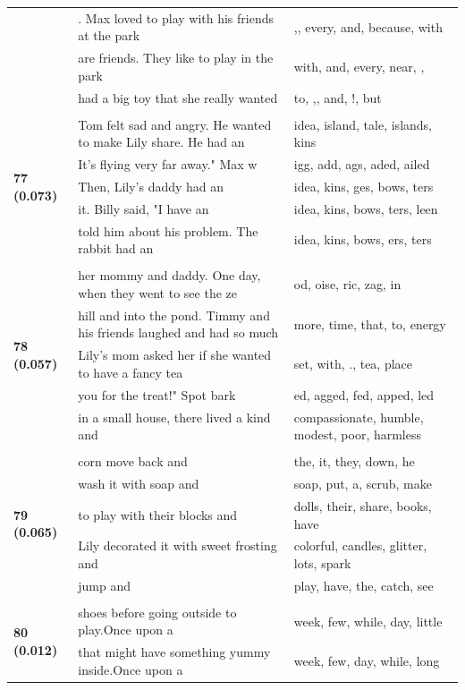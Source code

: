 \documentclass{article}
\theoremstyle{plain}
\theoremstyle{definition}
\theoremstyle{remark}
\begin{document}
\begin{longtable}{|p{}|p{}|p{}|}
& . Max loved to play with his friends at the park & ,,  every,  and,  because,  with \\
& are friends. They like to play in the park & with,  and,  every,  near, , \\
& had a big toy that she really wanted & to, ,,  and, !,  but \\
& & \\
\multirow{5}{*}{\textbf{77 (0.073)}} & Tom felt sad and angry. He wanted to make Lily share. He had an & idea,  island,  tale,  islands, kins \\
& It's flying very far away."  Max w & igg, add, ags, aded, ailed \\
& Then, Lily's daddy had an & idea, kins, ges, bows, ters \\
& it. Billy said, "I have an & idea, kins, bows, ters, leen \\
& told him about his problem.   The rabbit had an & idea, kins, bows, ers, ters \\
& & \\
\multirow{5}{*}{\textbf{78 (0.057)}} & her mommy and daddy. One day, when they went to see the ze & od, oise, ric, zag, in \\
& hill and into the pond. Timmy and his friends laughed and had so much & more,  time,  that,  to,  energy \\
& Lily's mom asked her if she wanted to have a fancy tea & set,  with, .,  tea,  place \\
& you for the treat!" Spot bark & ed, agged, fed, apped, led \\
& in a small house, there lived a kind and & compassionate,  humble,  modest,  poor,  harmless \\
& & \\
\multirow{5}{*}{\textbf{79 (0.065)}} & corn move back and & the,  it,  they,  down,  he \\
& wash it with soap and & soap,  put,  a,  scrub,  make \\
& to play with their blocks and & dolls,  their,  share,  books,  have \\
& Lily decorated it with sweet frosting and & colorful,  candles,  glitter,  lots,  spark \\
& jump and & play,  have,  the,  catch,  see \\
& & \\
\multirow{5}{*}{\textbf{80 (0.012)}} & shoes before going outside to play.Once upon a & week,  few,  while,  day,  little \\
& that might have something yummy inside.Once upon a & week,  few,  day,  while,  long \\

\end{longtable}
\end{document}
